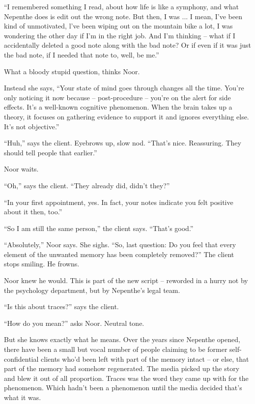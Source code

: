 \documentclass[12pt,a5paper]{book}
\newcommand{\qm}[1]{“#1”}
\begin{document}
\qm{I remembered something I read, about how life is like a symphony, and what Nepenthe does is edit out the wrong note. But then, I was ... I mean, I've been kind of unmotivated, l've been wiping out on the mountain bike a lot, I was wondering the other day if I'm in the right job. And I'm thinking – what if I accidentally deleted a good note along with the bad note? Or if even if it was just the bad note, if I needed that note to, well, be me.}

What a bloody stupid question, thinks Noor.

Instead she says, \qm{Your state of mind goes through changes all the time. You're only noticing it now because – post-procedure – you're on the alert for side effects. It's a well-known cognitive phenomenon. When the brain takes up a theory, it focuses on gathering evidence to support it and ignores everything else. It's not objective.}

\qm{Huh,} says the client. Eyebrows up, slow nod. \qm{That's nice. Reassuring. They should tell people that earlier.}

Noor waits.

\qm{Oh,} says the client. \qm{They already did, didn't they?}

\qm{In your first appointment, yes. In fact, your notes indicate you felt positive about it then, too.}

\qm{So I am still the same person,} the client says. \qm{That's good.}

\qm{Absolutely,} Noor says. She sighs. \qm{So, last question: Do you feel that every element of the unwanted memory has been completely removed?} The client stops smiling. He frowns.

Noor knew he would. This is part of the new script – reworded in a hurry not by the psychology department, but by Nepenthe's legal team.

\qm{Is this about traces?} says the client.

\qm{How do you mean?} asks Noor. Neutral tone.

But she knows exactly what he means. Over the years since Nepenthe opened, there have been a small but vocal number of people claiming to be former self-confidential clients who'd been left with part of the memory intact – or else, that part of the memory had somehow regenerated. The media picked up the story and blew it out of all proportion. Traces was the word they came up with for the phenomenon. Which hadn't been a phenomenon until the media decided that's what it was.
\end{document}
